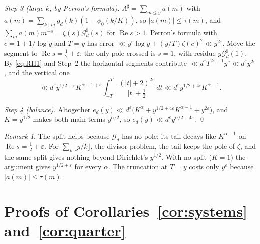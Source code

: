 \documentclass[11pt]{amsart}
\theoremstyle{remark}
\newtheorem{remark}[lemma]{Remark}
\numberwithin{equation}{section}
\newcommand{\cG}{\mathcal{G}}
\newcommand{\eps}{\varepsilon}
\DeclareMathOperator{\re}{Re}
\begin{document}
\emph{Step 3 (large $k$, by Perron's formula).} $A^\sharp=\sum_{m\le y}a(m)$ with $a(m)=\sum_{k\mid m}g_d(k)(1-\phi_0(k/K))$, so $|a(m)|\le\tau(m)$, and $\sum_ma(m)m^{-s}=\zeta(s)\cG^\sharp_d(s)$ for $\re s>1$. Perron's formula with $c=1+1/\log y$ and $T=y$ has error $\ll y^{\eps}\log y+(y/T)\zeta(c)^2\ll y^{2\eps}$. Move the segment to $\re s=\tfrac12+\eps$: the only pole crossed is $s=1$, with residue $y\cG^\sharp_d(1)$. By \eqref{eq:RH1} and Step~2 the horizontal segments contribute $\ll d^{\eps}T^{2\eps-1}y^{c}\ll d^{\eps}y^{2\eps}$, and the vertical one
\[
\ll d^{\eps}y^{1/2+\eps}K^{\alpha-1+\eps}\int_{-T}^{T}\frac{(|t|+2)^{2\eps}}{|t|+\tfrac12}\,dt\ll d^{\eps}y^{1/2+4\eps}K^{\alpha-1}.
\]

\emph{Step 4 (balance).} Altogether $e_d(y)\ll d^{\eps}\bigl(K^{\alpha}+y^{1/2+4\eps}K^{\alpha-1}+y^{2\eps}\bigr)$, and $K=y^{1/2}$ makes both main terms $y^{\alpha/2}$, so $e_d(y)\ll d^{\eps}y^{\alpha/2+4\eps}$. \qed

\begin{remark}
The split helps because $\cG_d$ has no pole: its tail decays like $K^{\alpha-1}$ on $\re s=\tfrac12+\eps$. For $\sum_k\lfloor y/k\rfloor$, the divisor problem, the tail keeps the pole of $\zeta$, and the same split gives nothing beyond Dirichlet's $y^{1/2}$. With no split ($K=1$) the argument gives $y^{1/2+\eps}$ for every $\alpha$. The truncation at $T=y$ costs only $y^{\eps}$ because $|a(m)|\le\tau(m)$.
\end{remark}

\section{Proofs of Corollaries~\ref{cor:systems} and~\ref{cor:quarter}}\label{sec:cor}
\end{document}
